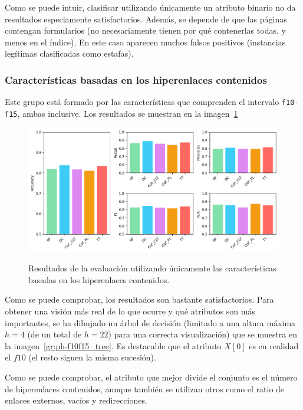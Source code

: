Como se puede intuir, clasificar utilizando únicamente un atributo binario no da resultados especiamente satisfactorios. Además, se depende de que las páginas contengan formularios (no necesariamente tienen por qué contenerlas todas, y menos en el índice). En este caso aparecen muchos falsos positivos (instancias legítimas clasificadas como estafas).

\subsubsection{Características basadas en los hiperenlaces contenidos}
Este grupo está formado por las características que comprenden el intervalo \texttt{f10-f15}, ambas inclusive. Los resultados se muestran en la imagen~\ref{gr:ph-f10f15_small}

\begin{figure}[h]
	\caption[\textit{Phishing}: detección (\texttt{f10-f15})]{Resultados de la evaluación utilizando únicamente las características basadas en los hiperenlaces contenidos.}
	\centering
	\includegraphics[width=\textwidth]{../img/memoria/5_phishing/f10f15_big}
	\label{gr:ph-f10f15_small}
\end{figure}

Como se puede comprobar, los resultados son bastante satisfactorios. Para obtener una visión más real de lo que ocurre y qué atributos son más importantes, se ha dibujado un árbol de decisión (limitado a una altura máxima $h = 4$ (de un total de $h = 22$) para una correcta visualización) que se muestra en la imagen~\ref{gr:ph-f10f15_tree}. Es destacable que el atributo $X[0]$ es en realidad el $f10$ (el resto siguen la misma sucesión).

Como se puede comprobar, el atributo que mejor divide el conjunto es el número de hiperenlaces contenidos, aunque también se utilizan otros como el ratio de enlaces externos, vacíos y redirecciones.

